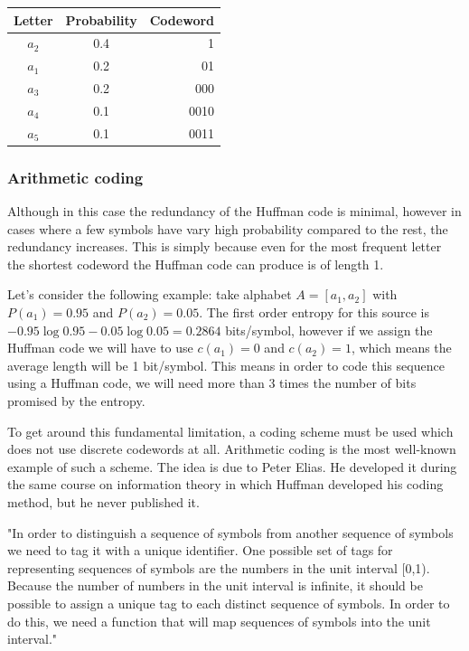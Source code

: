       \begin{table}
        \centering
        \begin{tabular}{ccr}
          \toprule
          Letter & Probability & Codeword \\
          \midrule
          $a_2$ & 0.4 & 1 \\
          $a_1$ & 0.2 & 01 \\
          $a_3$ & 0.2 & 000 \\
          $a_4$ & 0.1 & 0010 \\
          $a_5$ & 0.1 & 0011 \\
          \bottomrule
        \end{tabular}
        \label{tab:huffman2}
      \end{table}


    \subsubsection{Arithmetic coding}
      Although in this case the redundancy of the Huffman code is minimal, however in cases where a few symbols have vary high probability compared to the rest, the redundancy increases. This is simply because even for the most frequent letter the shortest codeword the Huffman code can produce is of length 1.

      Let's consider the following example: take alphabet $A=[a_1, a_2]$ with $P(a_1) = 0.95$ and $P(a_2) = 0.05$. The first order entropy for this source is $-0.95 \log 0.95 - 0.05 \log 0.05 = 0.2864$ bits/symbol, however if we assign the Huffman code we will have to use $c(a_1)=0$ and $c(a_2)=1$, which means the average length will be 1 bit/symbol. This means in order to code this sequence using a Huffman code, we will need more than 3 times the number of bits promised by the entropy.

      To get around this fundamental limitation, a coding scheme must be used which does not use discrete codewords at all. Arithmetic coding is the most well-known example of such a scheme. The idea is due to Peter Elias. He developed it during the same course on information theory in which Huffman developed his coding method, but he never published it.

      "In order to distinguish a sequence of symbols from another sequence of symbols we need to tag it with a unique identifier. One possible set of tags for representing sequences of symbols are the numbers in the unit interval [0,1). Because the number of numbers in the unit interval is infinite, it should be possible to assign a unique tag to each distinct sequence of symbols. In order to do this, we need a function that will map sequences of symbols into the unit interval."

